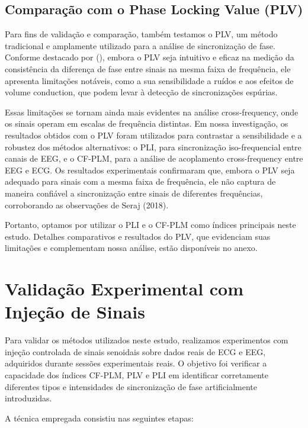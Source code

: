 \subsection{Comparação com o Phase Locking Value (PLV)}

Para fins de validação e comparação, também testamos o PLV, um método tradicional e amplamente utilizado para a análise de sincronização de fase. Conforme destacado por \citeauthor{seraj2018} (\citeyear{seraj2018}), embora o PLV seja intuitivo e eficaz na medição da consistência da diferença de fase entre sinais na mesma faixa de frequência, ele apresenta limitações notáveis, como a sua sensibilidade a ruídos e aos efeitos de volume conduction, que podem levar à detecção de sincronizações espúrias.

Essas limitações se tornam ainda mais evidentes na análise cross-frequency, onde os sinais operam em escalas de frequência distintas. Em nossa investigação, os resultados obtidos com o PLV foram utilizados para contrastar a sensibilidade e a robustez dos métodos alternativos: o PLI, para sincronização iso-frequencial entre canais de EEG, e o CF-PLM, para a análise de acoplamento cross-frequency entre EEG e ECG. Os resultados experimentais confirmaram que, embora o PLV seja adequado para sinais com a mesma faixa de frequência, ele não captura de maneira confiável a sincronização entre sinais de diferentes frequências, corroborando as observações de Seraj (2018).

Portanto, optamos por utilizar o PLI e o CF-PLM como índices principais neste estudo. Detalhes comparativos e resultados do PLV, que evidenciam suas limitações e complementam nossa análise, estão disponíveis no anexo.

\section{Validação Experimental com Injeção de Sinais}

Para validar os métodos utilizados neste estudo, realizamos experimentos com injeção controlada de sinais senoidais sobre dados reais de ECG e EEG, adquiridos durante sessões experimentais reais. O objetivo foi verificar a capacidade dos índices CF-PLM, PLV e PLI em identificar corretamente diferentes tipos e intensidades de sincronização de fase artificialmente introduzidas.

A técnica empregada consistiu nas seguintes etapas:

